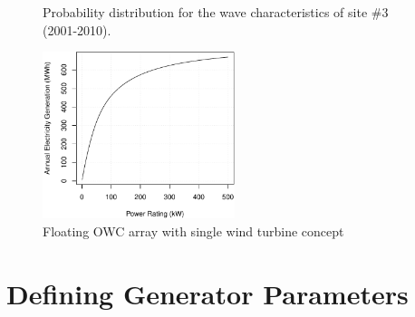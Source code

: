 \documentclass[twocolumn]{article}
\begin{document}
\begin{figure}[]
  \centering

    \caption{Probability distribution for the wave characteristics of site \#3 (2001-2010).} 
    \label{spain_site}
\end{figure}



  \begin{figure}
    \centering
    \includegraphics[width=0.5\textwidth]{generator_rating}
    \caption{Floating OWC array with single wind turbine concept } 
    \label{generator_rating}
  \end{figure}

\section{Defining Generator Parameters}
\end{document}

